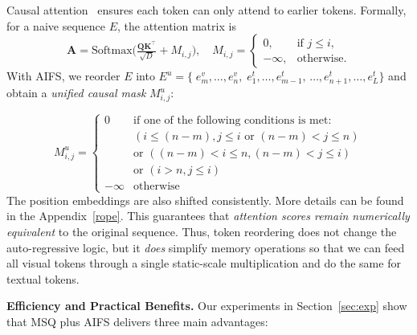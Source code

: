 Causal attention~\citep{vaswani2017attention} ensures each token can only attend to earlier tokens. Formally, for a naive sequence $E$, the attention matrix is  
\begin{equation}
    \mathbf{A} = \mathrm{Softmax}\!\bigl(\tfrac{\mathbf{Q}\mathbf{K}^\top}{\sqrt{D}} + M_{i,j}\bigr), 
    \quad
    M_{i,j} =
    \begin{cases}
    0, & \text{if } j \leq i,\\
    -\infty, & \text{otherwise}.
    \end{cases}
\label{eq:casual_mask_mt}
\end{equation}
With AIFS, we reorder $E$ into $E^{u} = \{\;e^v_m, \dots, e^v_n,\; e^t_1,\dots,e^t_{m-1},\, \dots, e^t_{n+1}, \dots, e^t_L\}$ and obtain a \emph{unified causal mask} $M^u_{i,j}$:

\begin{equation}
    M^{u}_{i,j} = 
\begin{cases} 
0 & \text{if one of the following conditions is met:} \\
& ( i \leq (n-m), j \leq i \text{ or } (n-m) < j \leq n) \\
&\text{or } ((n-m)<i \leq n, (n-m) < j \leq i) \\
&\text{or } (i > n, j \leq i) \\
-\infty &\text{otherwise} 
\end{cases}   
\label{eq:casual_unified}
\end{equation}
The position embeddings are also shifted consistently. More details can be found in the Appendix~\ref{rope}. This guarantees that \emph{attention scores remain numerically equivalent} to the original sequence. Thus, token reordering does not change the auto-regressive logic, but it \emph{does} simplify memory operations so that we can feed all visual tokens through a single static-scale multiplication and do the same for textual tokens.

\vspace{1mm}
\noindent
\textbf{Efficiency and Practical Benefits.}
Our experiments in Section~\ref{sec:exp} show that MSQ plus AIFS delivers three main advantages:

